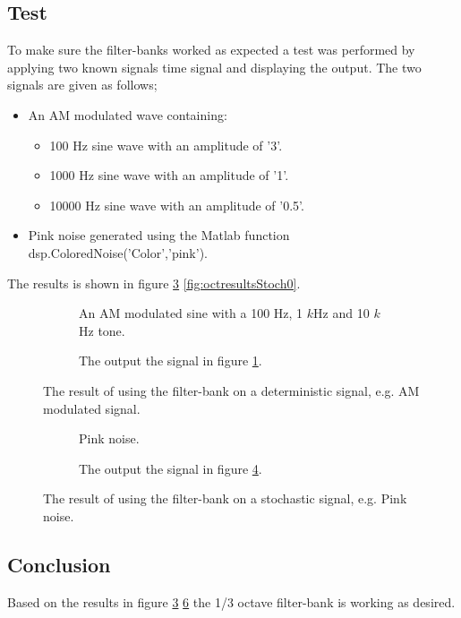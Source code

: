 \subsection{Test}

To make sure the filter-banks worked as expected a test was performed by applying two known signals time signal and displaying the output. The two signals are given as follows;
\vspace{-6mm}
\begin{itemize}
	\item An AM modulated wave containing:
	\begin{itemize}
		\item 100 Hz sine wave with an amplitude of '3'.
		\item 1000 Hz sine wave with an amplitude of '1'.
		\item 10000 Hz sine wave with an amplitude of '0.5'.
	\end{itemize}
	\item Pink noise generated using the Matlab function dsp.ColoredNoise('Color','pink').
\end{itemize}
\vspace{-3mm}
The results is shown in figure \ref{fig:octresultsDeterm} \ref{fig:octresultsStoch0}. 

\begin{figure}[H]
	\centering	
	\begin{subfigure}[b]{0.45\textwidth}
		\centering
		
		\caption{An AM modulated sine with a 100 Hz, 1 $k$Hz and 10 $k$Hz tone.}
		\label{fig:Signal01k1k10k}
	\end{subfigure}
	\hfill
	\begin{subfigure}[b]{0.45\textwidth}
		\centering
		
		\caption{The output the signal in figure \ref{fig:Signal01k1k10k}.}
		\label{fig:OctFilter01k1k10k}
	\end{subfigure}
	\caption{The result of using the filter-bank on a deterministic signal, e.g. AM modulated signal.}
	\label{fig:octresultsDeterm}
\end{figure}

\begin{figure}[H]
	\centering	
	\begin{subfigure}[b]{0.45\textwidth}
		\centering
			
		\caption{Pink noise.}
		\label{fig:PinkNoise5sec}
	\end{subfigure}	
	\hfill
	\begin{subfigure}[b]{0.45\textwidth}
		\centering
		
		\caption{The output the signal in figure \ref{fig:PinkNoise5sec}.}
		\label{fig:OctFilterPink}
	\end{subfigure}	
	\caption{The result of using the filter-bank on a stochastic signal, e.g. Pink noise.}
	\label{fig:octresultsStoch}
\end{figure}

\subsection{Conclusion}
Based on the results in figure \ref{fig:octresultsDeterm} \ref{fig:octresultsStoch} the 1/3 octave filter-bank is working as desired.

